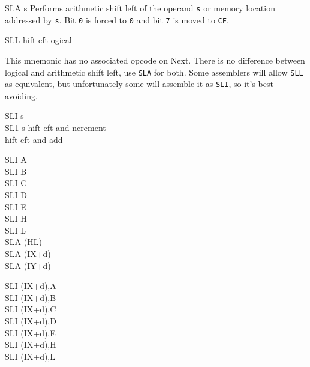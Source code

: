 \documentclass[12pt,twoside,openright,a4paper]{book}
\begin{document}
\begin{basedescript}{
	\desclabelstyle{\multilinelabel}
	\desclabelwidth{3cm}}
\begin{DetailItem}{SLA s}
		Performs arithmetic shift left of the operand {\tt s} or memory location addressed by {\tt s}. Bit {\tt 0} is forced to {\tt 0} and bit {\tt 7} is moved to {\tt CF}.

		\begin{DetailEffects}[p]
			\FlagsSLAr
		\end{DetailEffects}
						
		\begin{DetailTiming}
		\end{DetailTiming}

	\end{DetailItem}

	\begin{DetailItem}{SLL}
		{hift \IH{L}eft ogical}
		{}

		This mnemonic has no associated opcode on Next. There is no difference between logical and arithmetic shift left, use {\tt SLA} for both. Some assemblers will allow {\tt SLL} as equivalent, but unfortunately some will assemble it as {\tt SLI}, so it's best avoiding.
		
	\end{DetailItem}

	\pagebreak
	\begin{DetailItem}{SLI s\UNDOC\\SL1 s\UNDOC}
		{hift eft and ncrement\\
		hift eft and add }
		{}
		
		\begin{DetailVariants}
			SLI A\\
			SLI B\\
			SLI C\\
			SLI D\\
			SLI E\\
			SLI H\\
			SLI L\\
			SLA (HL)\\
			SLA (IX+d)\\
			SLA (IY+d)

			\columnbreak
			SLI (IX+d),A\UNDOC\\
			SLI (IX+d),B\UNDOC\\
			SLI (IX+d),C\UNDOC\\
			SLI (IX+d),D\UNDOC\\
			SLI (IX+d),E\UNDOC\\
			SLI (IX+d),H\UNDOC\\
			SLI (IX+d),L\UNDOC


\end{DetailVariants}
\end{DetailItem}
\end{basedescript}
\end{document}
